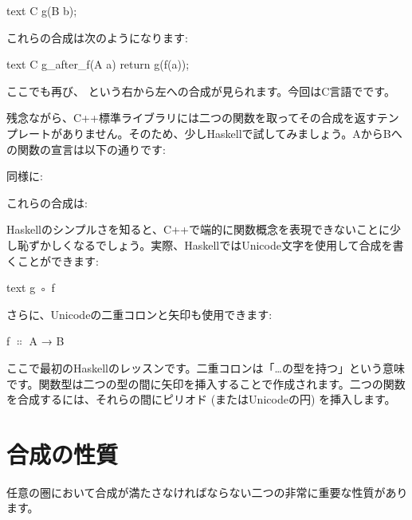 \begin{snip}{text}
C g(B b);
\end{snip}
これらの合成は次のようになります:

\begin{snip}{text}
C g_after_f(A a)
{
    return g(f(a));
}
\end{snip}
ここでも再び、 という右から左への合成が見られます。今回はC言語でです。

残念ながら、C++標準ライブラリには二つの関数を取ってその合成を返すテンプレートがありません。そのため、少しHaskellで試してみましょう。AからBへの関数の宣言は以下の通りです:

同様に:

これらの合成は:

Haskellのシンプルさを知ると、C++で端的に関数概念を表現できないことに少し恥ずかしくなるでしょう。実際、HaskellではUnicode文字を使用して合成を書くことができます:
\begin{snip}{text}
g ◦ f
\end{snip}

さらに、Unicodeの二重コロンと矢印も使用できます:
\begin{snipv}
f \ensuremath{\Colon} A → B
\end{snipv}
ここで最初のHaskellのレッスンです。二重コロンは「\ldots{}の型を持つ」という意味です。関数型は二つの型の間に矢印を挿入することで作成されます。二つの関数を合成するには、それらの間にピリオド (またはUnicodeの円) を挿入します。

\section{合成の性質}

任意の圏において合成が満たさなければならない二つの非常に重要な性質があります。

